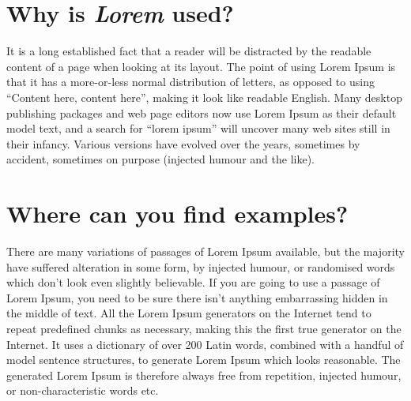 \section{Why is \emph{Lorem} used?}

It is a long established fact that a reader will be distracted by the
readable content of a page when looking at its layout. The point of
using Lorem Ipsum is that it has a more-or-less normal distribution of
letters, as opposed to using ``Content here, content here'', making it
look like readable English. Many desktop publishing packages and web
page editors now use Lorem Ipsum as their default model text, and a
search for ``lorem ipsum'' will uncover many web sites still in their
infancy. Various versions have evolved over the years, sometimes by
accident, sometimes on purpose (injected humour and the like). 

\section{Where can you find examples?}

There are many variations of passages of Lorem Ipsum available, but
the majority have suffered alteration in some form, by injected
humour, or randomised words which don't look even slightly
believable. If you are going to use a passage of Lorem Ipsum, you need
to be sure there isn't anything embarrassing hidden in the middle of
text. All the Lorem Ipsum generators on the Internet tend to repeat
predefined chunks as necessary, making this the first true generator
on the Internet. It uses a dictionary of over 200 Latin words,
combined with a handful of model sentence structures, to generate
Lorem Ipsum which looks reasonable. The generated Lorem Ipsum is
therefore always free from repetition, injected humour, or
non-characteristic words etc. 
